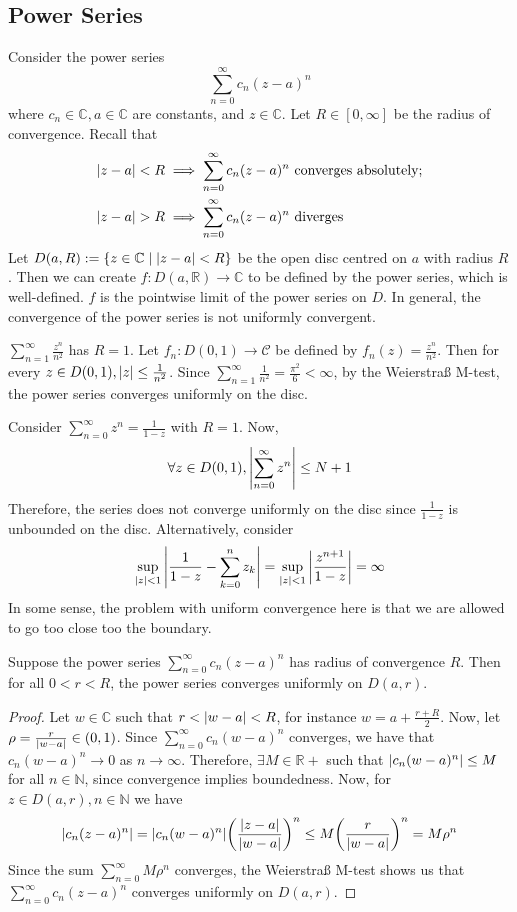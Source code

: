 \subsection{Power Series}
Consider the power series
\[
	\sum_{n=0}^\infty c_n (z-a)^n
\]
where \( c_n \in \mathbb C, a \in \mathbb C \) are constants, and \( z \in \mathbb C \).
Let \( R \in [0, \infty] \) be the radius of convergence.
Recall that
\begin{align*}
	\abs{z-a} < R & \implies \sum_{n = 0}^\infty c_n (z-a)^n \text{ converges absolutely}; \\
	\abs{z-a} > R & \implies \sum_{n = 0}^\infty c_n (z-a)^n \text{ diverges}
\end{align*}
Let \( D(a, R) := \qty{z \in \mathbb C \mid \abs{z-a} < R} \) be the open disc centred on \( a \) with radius \( R \).
Then we can create \( f \colon D(a, \mathbb R) \to \mathbb C \) to be defined by the power series, which is well-defined.
\( f \) is the pointwise limit of the power series on \( D \).
In general, the convergence of the power series is not uniformly convergent.
\begin{example}
	\( \sum_{n=1}^\infty \frac{z^n}{n^2} \) has \( R = 1 \).
	Let \( f_n \colon D(0,1) \to \mathcal C \) be defined by \( f_n(z) = \frac{z^n}{n^2} \).
	Then for every \( z \in D(0,1), \abs{z} \leq \frac{1}{n^2} \).
	Since \( \sum_{n=1}^\infty \frac{1}{n^2} = \frac{\pi^2}{6} < \infty \), by the Weierstra\ss{} M-test, the power series converges uniformly on the disc.
\end{example}
\begin{example}
	Consider \( \sum_{n=0}^\infty z^n = \frac{1}{1-z} \) with \( R = 1 \).
	Now,
	\[
		\forall z \in D(0,1), \abs{\sum_{n=0}^\infty z^n} \leq N + 1
	\]
	Therefore, the series does not converge uniformly on the disc since \( \frac{1}{1-z} \) is unbounded on the disc.
	Alternatively, consider
	\[
		\sup_{\abs{z} < 1} \abs{\frac{1}{1-z} - \sum_{k=0}^n z_k} = \sup_{\abs{z} < 1} \abs{\frac{z^{n+1}}{1-z}} = \infty
	\]
	In some sense, the problem with uniform convergence here is that we are allowed to go too close too the boundary.
\end{example}
\begin{theorem}
	Suppose the power series \( \sum_{n=0}^\infty c_n (z-a)^n \) has radius of convergence \( R \).
	Then for all \( 0 < r < R \), the power series converges uniformly on \( D(a,r) \).
\end{theorem}
\begin{proof}
	Let \( w \in \mathbb C \) such that \( r < \abs{w - a} < R \), for instance \( w = a + \frac{r + R}{2} \).
	Now, let \( \rho = \frac{r}{\abs{w-a}} \in (0,1) \).
	Since \( \sum_{n=0}^\infty c_n (w-a)^n \) converges, we have that \( c_n (w-a)^n \to 0 \) as \( n \to \infty \).
	Therefore, \( \exists M \in \mathbb R+ \) such that \( \abs{c_n (w-a)^n} \leq M \) for all \( n \in \mathbb N \), since convergence implies boundedness.
	Now, for \( z \in D(a,r), n \in \mathbb N \) we have
	\[
		\abs{c_n(z-a)^n} = \abs{c_n(w-a)^n} \qty(\frac{\abs{z-a}}{\abs{w-a}})^n \leq M \qty(\frac{r}{\abs{w-a}})^n = M\rho^n
	\]
	Since the sum \( \sum_{n=0}^\infty M \rho^n \) converges, the Weierstra\ss{} M-test shows us that \( \sum_{n=0}^\infty c_n (z-a)^n \) converges uniformly on \( D(a,r) \).
\end{proof}
